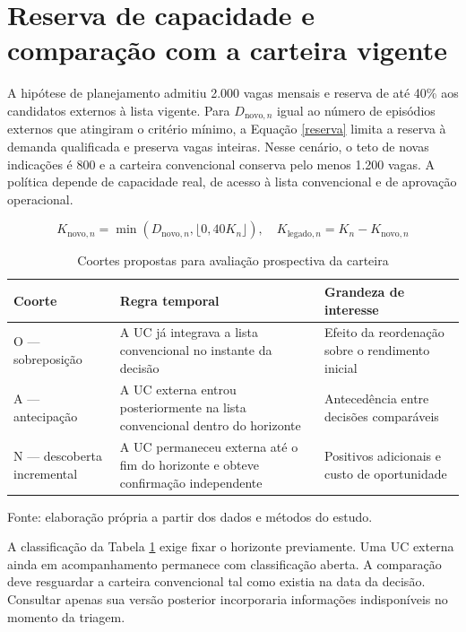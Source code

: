 \section{Reserva de capacidade e comparação com a carteira vigente}
A hipótese de planejamento admitiu 2.000 vagas mensais e reserva de até 40\% aos candidatos externos à lista vigente. Para $D_{\mathrm{novo},n}$ igual ao número de episódios externos que atingiram o critério mínimo, a Equação \eqref{reserva} limita a reserva à demanda qualificada e preserva vagas inteiras. Nesse cenário, o teto de novas indicações é 800 e a carteira convencional conserva pelo menos 1.200 vagas. A política depende de capacidade real, de acesso à lista convencional e de aprovação operacional.

\begin{equation}\label{reserva}
K_{\mathrm{novo},n}=\min(D_{\mathrm{novo},n},\lfloor0{,}40K_n\rfloor),\quad K_{\mathrm{legado},n}=K_n-K_{\mathrm{novo},n}
\end{equation}
\begin{table}[htbp]\centering\small\caption{Coortes propostas para avaliação prospectiva da carteira}\label{coortes}
\begin{tabular}{>{\raggedright\arraybackslash}p{}>{\raggedright\arraybackslash}p{}>{\raggedright\arraybackslash}p{}}\toprule
Coorte & Regra temporal & Grandeza de interesse \\ \midrule
O — sobreposição & A UC já integrava a lista convencional no instante da decisão & Efeito da reordenação sobre o rendimento inicial \\
A — antecipação & A UC externa entrou posteriormente na lista convencional dentro do horizonte & Antecedência entre decisões comparáveis \\
N — descoberta incremental & A UC permaneceu externa até o fim do horizonte e obteve confirmação independente & Positivos adicionais e custo de oportunidade \\
\bottomrule\end{tabular}
\par\small Fonte: elaboração própria a partir dos dados e métodos do estudo.
\end{table}
A classificação da Tabela \ref{coortes} exige fixar o horizonte previamente. Uma UC externa ainda em acompanhamento permanece com classificação aberta. A comparação deve resguardar a carteira convencional tal como existia na data da decisão. Consultar apenas sua versão posterior incorporaria informações indisponíveis no momento da triagem.

